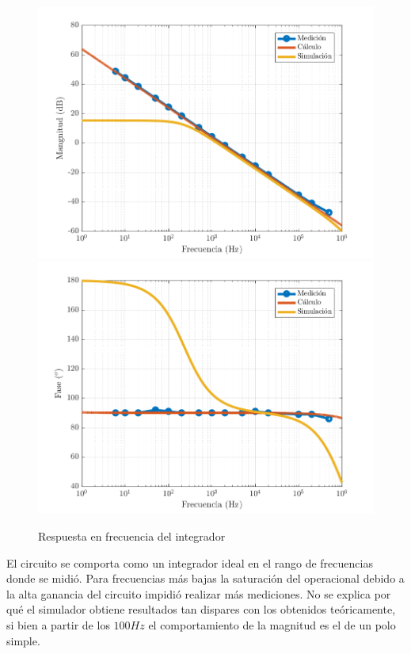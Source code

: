 \documentclass[../../main.tex]{subfiles}
\begin{document}
\begin{figure}  [H]
	\centering
	\label{fig:i-hf}
	\includegraphics[scale=0.7]{fotos/tc_tp2_ej4_i_Hf_mag.png}
	\includegraphics[scale=0.7]{fotos/tc_tp2_ej4_i_Hf_fase.png}
	\caption{Respuesta en frecuencia del integrador}
\end{figure}

El circuito se comporta como un integrador ideal en el rango de frecuencias donde se midi\'o. Para frecuencias m\'as bajas la saturaci\'on del operacional debido a la alta ganancia del circuito impidi\'o realizar m\'as mediciones. No se explica por qu\'e el simulador obtiene resultados tan dispares con los obtenidos te\'oricamente, si bien a partir de los $100Hz$ el comportamiento de la magnitud es el de un polo simple.
\end{document}
